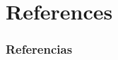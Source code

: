 \documentclass[xcolor=dvipsnames]{beamer}
\begin{document}










\section{References}
\begin{frame}[t, allowframebreaks]
\frametitle{Referencias}
\tiny


\end{frame}
\end{document}
